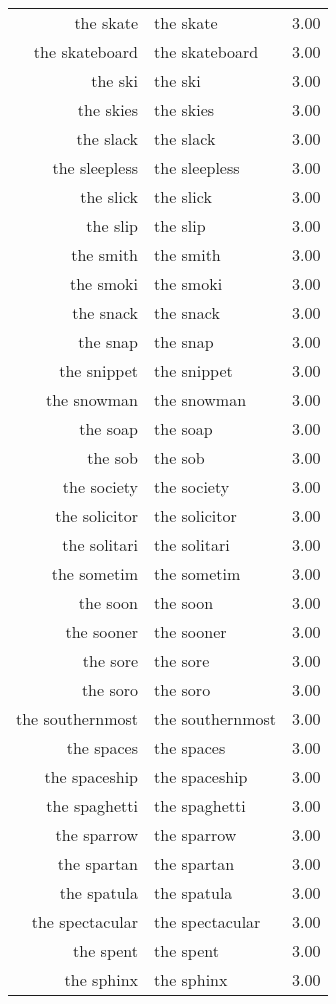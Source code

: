 \begin{table}[ht]
\begin{tabular}{rlr}
  the skate & the skate & 3.00 \\ 
  the skateboard & the skateboard & 3.00 \\ 
  the ski & the ski & 3.00 \\ 
  the skies & the skies & 3.00 \\ 
  the slack & the slack & 3.00 \\ 
  the sleepless & the sleepless & 3.00 \\ 
  the slick & the slick & 3.00 \\ 
  the slip & the slip & 3.00 \\ 
  the smith & the smith & 3.00 \\ 
  the smoki & the smoki & 3.00 \\ 
  the snack & the snack & 3.00 \\ 
  the snap & the snap & 3.00 \\ 
  the snippet & the snippet & 3.00 \\ 
  the snowman & the snowman & 3.00 \\ 
  the soap & the soap & 3.00 \\ 
  the sob & the sob & 3.00 \\ 
  the society & the society & 3.00 \\ 
  the solicitor & the solicitor & 3.00 \\ 
  the solitari & the solitari & 3.00 \\ 
  the sometim & the sometim & 3.00 \\ 
  the soon & the soon & 3.00 \\ 
  the sooner & the sooner & 3.00 \\ 
  the sore & the sore & 3.00 \\ 
  the soro & the soro & 3.00 \\ 
  the southernmost & the southernmost & 3.00 \\ 
  the spaces & the spaces & 3.00 \\ 
  the spaceship & the spaceship & 3.00 \\ 
  the spaghetti & the spaghetti & 3.00 \\ 
  the sparrow & the sparrow & 3.00 \\ 
  the spartan & the spartan & 3.00 \\ 
  the spatula & the spatula & 3.00 \\ 
  the spectacular & the spectacular & 3.00 \\ 
  the spent & the spent & 3.00 \\ 
  the sphinx & the sphinx & 3.00 \\ 

\end{tabular}
\end{table}
